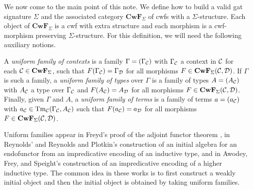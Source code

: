 \documentclass{lmcs}
\def\D{\mathcal{D}}
\def\Cwf{\mathbf{CwF}}
\begin{document}
We now come to the main point of this note.
We define how to build a valid gat signature $\Sigma$ and the associated
category $\Cwf_{\Sigma}$ of cwfs with a $\Sigma$-structure.
Each object of $\Cwf_{\Sigma}$ is a cwf with extra structure and
each morphism is a cwf-morphism preserving $\Sigma$-structure.
For this definition, we will need the following auxiliary notions.

A {\em uniform family of contexts} is a family $\Gamma = (\Gamma_{{\mathcal C}})$ with $\Gamma_{\mathcal C}$ a context in 
${\mathcal C}$ for each $\C \in \Cwf_{\Sigma}$, such that
$F(\Gamma_\C) = \Gamma_\D$ for all morphisms $F \in \Cwf_{\Sigma}(\C,\D)$.
If $\Gamma$ is such a family, a {\em uniform family of types} over $\Gamma$ is a
family of types $A = (A_{{\mathcal C}})$ with $A_{{\mathcal C}}$ a type over $\Gamma_{{\mathcal C}}$ and
$F(A_{\C}) = A_{\D}$ for all morphisms $F \in \Cwf_{\Sigma}(\C,\D)$.
Finally, given $\Gamma$ and $A$, a {\em uniform family of terms} is a family
of terms $a = (a_{{\mathcal C}})$ with $a_{\mathcal C} \in \mathrm{Tm}_{{\mathcal C}}(\Gamma_{{\mathcal C}},A_{{\mathcal C}})$ such that
$F(a_{\C}) = a_{\D}$ for all morphisms $F \in \Cwf_{\Sigma}(\C,\D)$. 

\begin{remark}
Uniform families appear in Freyd's proof of the adjoint functor theorem \cite{freyd:abelian}, in Reynolds' \cite{reynolds:impredicative} and Reynolds and Plotkin's construction \cite{plotkin-reynolds} of an initial algebra for an endofunctor from an impredicative encoding of an inductive type, and in Awodey, Frey, and Speight's  \cite{awodey:impredicative} construction of an impredicative encoding of a higher inductive type. The common idea in these works is to first construct a weakly initial object and then the initial object is obtained by taking uniform families.
\end{remark}
\end{document}
